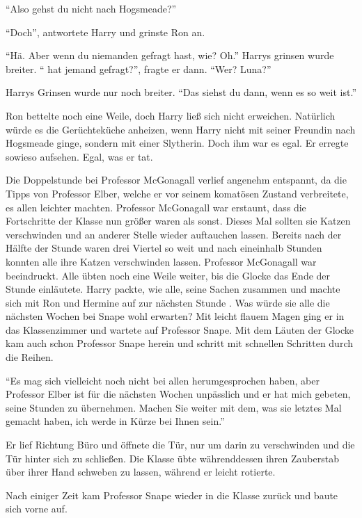 \enquote{Also gehst du nicht nach Hogsmeade?}

\enquote{Doch}, antwortete Harry und grinste Ron an.

\enquote{Hä. Aber wenn du niemanden gefragt hast, wie\abs? Oh.} Harrys grinsen wurde breiter. \enquote{ hat jemand gefragt?}, fragte er dann. \enquote{Wer? Luna?}

Harrys Grinsen wurde nur noch breiter. \enquote{Das siehst du dann, wenn es so weit ist.}

Ron bettelte noch eine Weile, doch Harry ließ sich nicht erweichen. Natürlich würde es die Gerüchteküche anheizen, wenn Harry nicht mit seiner Freundin nach Hogsmeade ginge, sondern mit einer Slytherin. Doch ihm war es egal. Er erregte sowieso aufsehen. Egal, was er tat.

\trenn

Die Doppelstunde bei Professor McGonagall verlief angenehm entspannt, da die Tipps von Professor Elber, welche er vor seinem komatösen Zustand verbreitete, es allen leichter machten. Professor McGonagall war erstaunt, dass die Fortschritte der Klasse nun größer waren als sonst. Dieses Mal sollten sie Katzen verschwinden und an anderer Stelle wieder auftauchen lassen. Bereits nach der Hälfte der Stunde waren drei Viertel so weit und nach eineinhalb Stunden konnten alle ihre Katzen verschwinden lassen. Professor McGonagall war beeindruckt. Alle übten noch eine Weile weiter, bis die Glocke das Ende der Stunde einläutete. Harry packte, wie alle, seine Sachen zusammen und machte sich mit Ron und Hermine auf zur nächsten Stunde . Was würde sie alle die nächsten Wochen bei Snape wohl erwarten? Mit leicht flauem Magen ging er in das Klassenzimmer und wartete auf Professor Snape. Mit dem Läuten der Glocke kam auch schon Professor Snape herein und schritt mit schnellen Schritten durch die Reihen.

\enquote{Es mag sich vielleicht noch nicht bei allen herumgesprochen haben, aber Professor Elber ist für die nächsten Wochen unpässlich und er hat mich gebeten, seine Stunden zu übernehmen. Machen Sie weiter mit dem, was sie letztes Mal gemacht haben, ich werde in Kürze bei Ihnen sein.}

Er lief Richtung Büro und öffnete die Tür, nur um darin zu verschwinden und die Tür hinter sich zu schließen. Die Klasse übte währenddessen ihren Zauberstab über ihrer Hand schweben zu lassen, während er leicht rotierte.

Nach einiger Zeit kam Professor Snape wieder in die Klasse zurück und baute sich vorne auf.

